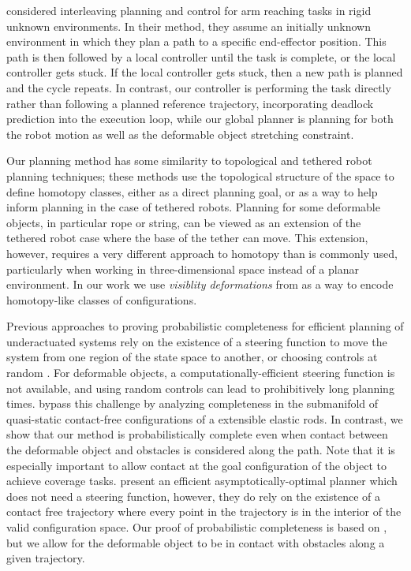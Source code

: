 \citet{Park2014Interleaving} considered interleaving planning and control for arm reaching tasks in rigid unknown environments. In their method, they assume an initially unknown environment in which they plan a path to a specific end-effector position. This path is then followed by a local controller until the task is complete, or the local controller gets stuck. If the local controller gets stuck, then a new path is planned and the cycle repeats. In contrast, our controller is performing the task directly rather than following a planned reference trajectory, incorporating deadlock prediction into the execution loop, while our global planner is planning for both the robot motion as well as the deformable object stretching constraint.

Our planning method has some similarity to topological \citep{Bhattacharya2012,Jaillet2008} and tethered robot \citep{Brass2015,SoonkyumKim2015} planning techniques; these methods use the topological structure of the space to define homotopy classes, either as a direct planning goal, or as a way to help inform planning in the case of tethered robots. Planning for some deformable objects, in particular rope or string, can be viewed as an extension of the tethered robot case where the base of the tether can move. This extension, however, requires a very different approach to homotopy than is commonly used, particularly when working in three-dimensional space instead of a planar environment. In our work we use \textit{visiblity deformations} from \cite{Jaillet2008} as a way to encode homotopy-like classes of configurations.

Previous approaches to proving probabilistic completeness for efficient planning of underactuated systems rely on the existence of a steering function to move the system from one region of the state space to another, or choosing controls at random \citep{LaValle2001,Karaman2013,Kunz2015,LiAOKP2016}. For deformable objects, a computationally-efficient steering function is not available, and using random controls can lead to prohibitively long planning times. \citet{Roussel2015} bypass this challenge by analyzing completeness in the submanifold of quasi-static contact-free configurations of a extensible elastic rods. In contrast, we show that our method is probabilistically complete even when contact between the deformable object and obstacles is considered along the path. Note that it is especially important to allow contact at the goal configuration of the object to achieve coverage tasks. \citet{LiAOKP2016} present an efficient asymptotically-optimal planner which does not need a steering function, however, they do rely on the existence of a contact free trajectory where every point in the trajectory is in the interior of the valid configuration space. Our proof of probabilistic completeness is based on \citet{LiAOKP2016}, but we allow for the deformable object to be in contact with obstacles along a given trajectory.

